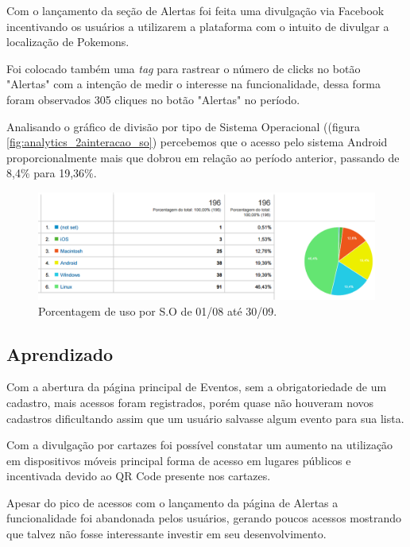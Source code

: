 \par Com o lançamento da seção de Alertas foi feita uma divulgação via Facebook incentivando os usuários a utilizarem a plataforma com o intuito de divulgar a localização de Pokemons.
\par Foi colocado também uma \emph{tag} para rastrear o número de clicks no botão "Alertas" com a intenção de medir o interesse na funcionalidade, dessa forma foram observados 305 cliques no botão "Alertas" no período.

\par Analisando o gráfico de divisão por tipo de Sistema Operacional ((figura \ref{fig:analytics_2ainteracao_so}) percebemos que o acesso pelo sistema Android proporcionalmente mais que dobrou em relação ao período anterior, passando de 8,4\% para 19,36\%.

\begin{figure}[htb]
\includegraphics[width=15cm]{figuras/analytics_2ainteracao_so}
\caption{\label{fig:analytics_1interacao_so} Porcentagem de uso por S.O de 01/08 até 30/09.}
\end{figure}

\subsection{Aprendizado}

\par Com a abertura da página principal de Eventos, sem a obrigatoriedade de um cadastro, mais acessos foram registrados, porém quase não houveram novos cadastros dificultando assim que um usuário salvasse algum evento para sua lista.

\par Com a divulgação por cartazes foi possível constatar um aumento na utilização em dispositivos móveis principal forma de acesso em lugares públicos e incentivada devido ao QR Code presente nos cartazes.

\par Apesar do pico de acessos com o lançamento da página de Alertas a funcionalidade foi abandonada pelos usuários, gerando poucos acessos mostrando que talvez não fosse interessante investir em seu desenvolvimento.

